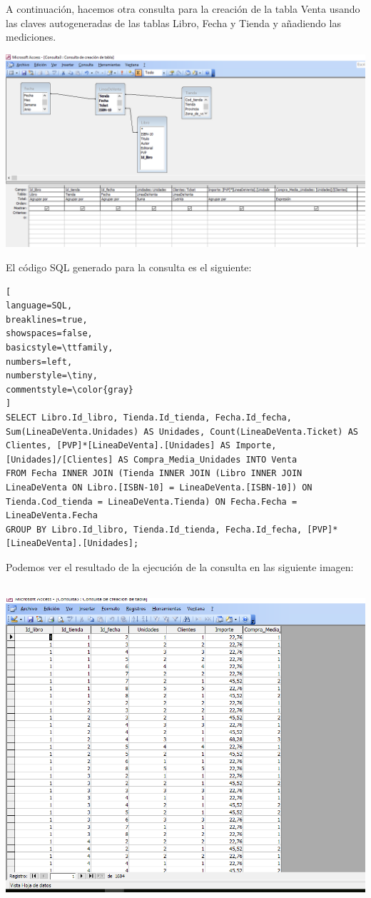 \documentclass[paper=a4, fontsize=11pt, spanish]{scrartcl}
\numberwithin{equation}{section} %
\numberwithin{figure}{section} %
\numberwithin{table}{section} %
\begin{document}
A continuación, hacemos otra consulta para la creación de la tabla Venta usando las claves autogeneradas de las tablas Libro, Fecha y Tienda y añadiendo las mediciones.
\begin{center}
	\includegraphics[scale=0.5]{img3.png}
\end{center}
El código SQL generado para la consulta es el siguiente:
\begin{lstlisting}[
language=SQL,
breaklines=true,
showspaces=false,
basicstyle=\ttfamily,
numbers=left,
numberstyle=\tiny,
commentstyle=\color{gray}
]
SELECT Libro.Id_libro, Tienda.Id_tienda, Fecha.Id_fecha, Sum(LineaDeVenta.Unidades) AS Unidades, Count(LineaDeVenta.Ticket) AS Clientes, [PVP]*[LineaDeVenta].[Unidades] AS Importe, [Unidades]/[Clientes] AS Compra_Media_Unidades INTO Venta
FROM Fecha INNER JOIN (Tienda INNER JOIN (Libro INNER JOIN LineaDeVenta ON Libro.[ISBN-10] = LineaDeVenta.[ISBN-10]) ON Tienda.Cod_tienda = LineaDeVenta.Tienda) ON Fecha.Fecha = LineaDeVenta.Fecha
GROUP BY Libro.Id_libro, Tienda.Id_tienda, Fecha.Id_fecha, [PVP]*[LineaDeVenta].[Unidades];
\end{lstlisting}
Podemos ver el resultado de la ejecución de la consulta en las siguiente imagen:\\
\\
\begin{center}
	\includegraphics[scale=0.5]{img4.png}
\end{center}
\bigskip 
\end{document}
